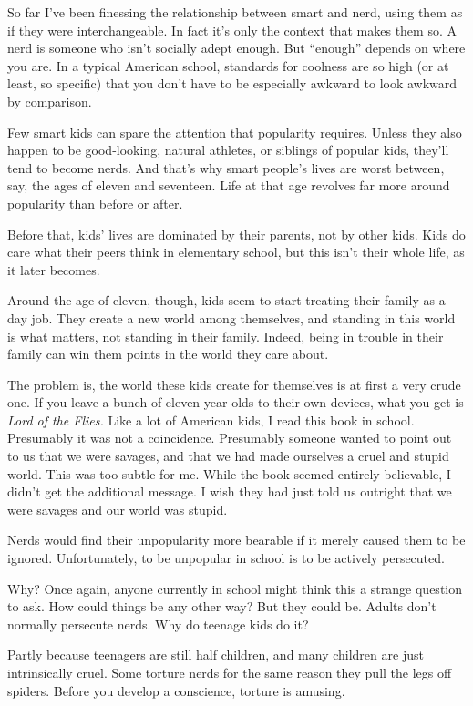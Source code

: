 So far I've been finessing the relationship between smart and nerd,
using them as if they were interchangeable. In fact it's only the
context that makes them so. A nerd is someone who isn't socially adept
enough. But ``enough'' depends on where you are. In a typical American
school, standards for coolness are so high (or at least, so specific)
that you don't have to be especially awkward to look awkward by
comparison.

Few smart kids can spare the attention that popularity requires. Unless
they also happen to be good-looking, natural athletes, or siblings of
popular kids, they'll tend to become nerds. And that's why smart
people's lives are worst between, say, the ages of eleven and seventeen.
Life at that age revolves far more around popularity than before or
after.

Before that, kids' lives are dominated by their parents, not by other
kids. Kids do care what their peers think in elementary school, but this
isn't their whole life, as it later becomes.

Around the age of eleven, though, kids seem to start treating their
family as a day job. They create a new world among themselves, and
standing in this world is what matters, not standing in their family.
Indeed, being in trouble in their family can win them points in the
world they care about.

The problem is, the world these kids create for themselves is at first a
very crude one. If you leave a bunch of eleven-year-olds to their own
devices, what you get is \emph{Lord of the Flies.} Like a lot of
American kids, I read this book in school. Presumably it was not a
coincidence. Presumably someone wanted to point out to us that we were
savages, and that we had made ourselves a cruel and stupid world. This
was too subtle for me. While the book seemed entirely believable, I
didn't get the additional message. I wish they had just told us outright
that we were savages and our world was stupid.

Nerds would find their unpopularity more bearable if it merely caused
them to be ignored. Unfortunately, to be unpopular in school is to be
actively persecuted.

Why? Once again, anyone currently in school might think this a strange
question to ask. How could things be any other way? But they could be.
Adults don't normally persecute nerds. Why do teenage kids do it?

Partly because teenagers are still half children, and many children are
just intrinsically cruel. Some torture nerds for the same reason they
pull the legs off spiders. Before you develop a conscience, torture is
amusing.

